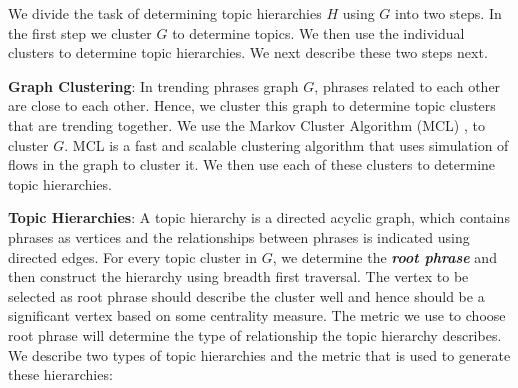 \documentclass{sig-alternate}
\begin{document}
We divide the task of determining topic hierarchies $H$ using $G$ into two steps. In the first step we cluster $G$ to determine topics. We then use the individual clusters to determine topic hierarchies. We next describe these two steps next. 

\medskip\noindent\textbf{Graph Clustering}: In trending phrases graph $G$, phrases related to each other are close to each other. Hence, we cluster this graph to determine topic clusters that are trending together. We use the Markov Cluster Algorithm (MCL) \cite{Dongen:2000:mcl}, to cluster $G$. MCL is a fast and scalable clustering algorithm that uses simulation of flows in the graph to cluster it. We then use each of these clusters to determine topic hierarchies.

\medskip\noindent\textbf{Topic Hierarchies}: A topic hierarchy is a directed acyclic graph, which contains phrases as vertices and the relationships between phrases is indicated using directed edges. For every topic cluster in $G$, we determine the \textbf{\textit{root phrase}} and then construct the hierarchy using breadth first traversal. The vertex to be selected as root phrase should describe the cluster well and hence should be a significant vertex based on some centrality measure. The metric we use to choose root phrase will determine the type of relationship the topic hierarchy describes. We describe two types of topic hierarchies and the metric that is used to generate these hierarchies:
\end{document}
